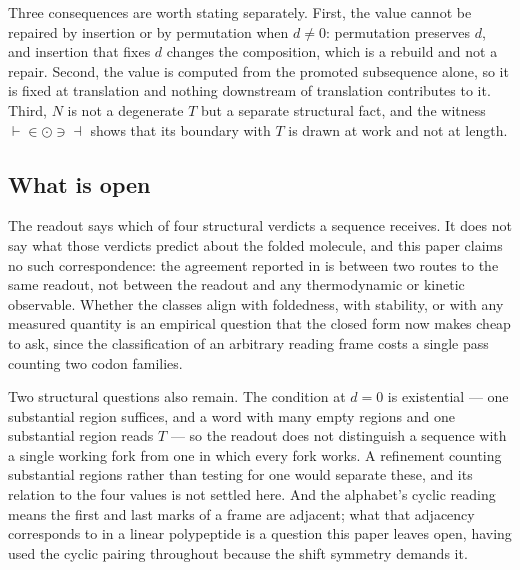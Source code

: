 \documentclass[12pt,a4paper]{article}
\begin{document}
Three consequences are worth stating separately. First, the value cannot be
repaired by insertion or by permutation when $d \neq 0$: permutation preserves $d$,
and insertion that fixes $d$ changes the composition, which is a rebuild and not a
repair. Second, the value is computed from the promoted subsequence alone, so it is
fixed at translation and nothing downstream of translation contributes to it.
Third, $N$ is not a degenerate $T$ but a separate structural fact, and the witness
$\vdash \in \odot \ni \dashv$ shows that its boundary with $T$ is drawn at work and
not at length.

\subsection{What is open}

The readout says which of four structural verdicts a sequence receives. It does not
say what those verdicts predict about the folded molecule, and this paper claims no
such correspondence: the agreement reported in  is between
two routes to the same readout, not between the readout and any thermodynamic or
kinetic observable. Whether the classes align with foldedness, with stability, or
with any measured quantity is an empirical question that the closed form now makes
cheap to ask, since the classification of an arbitrary reading frame costs a single
pass counting two codon families.

Two structural questions also remain. The condition at $d = 0$ is existential ---
one substantial region suffices, and a word with many empty regions and one
substantial region reads $T$ --- so the readout does not distinguish a sequence with
a single working fork from one in which every fork works. A refinement counting
substantial regions rather than testing for one would separate these, and its
relation to the four values is not settled here. And the alphabet's cyclic reading
means the first and last marks of a frame are adjacent; what that adjacency
corresponds to in a linear polypeptide is a question this paper leaves open, having
used the cyclic pairing throughout because the shift symmetry demands it.
\end{document}
